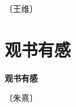 \documentclass[12pt,UTF-8,openany,fontset=none]{ctexbook}
\begin{document}
\begin{center}
    \vspace{10pt}
    
    \begin{large}
        
        〔王维〕
        
    \end{large}
    
    \vspace{8pt}
    
    \begin{huge}
        
        \phantom{。}

        \phantom{。}
        
        \phantom{。}

        \phantom{。}
        
    \end{huge}
    
\end{center}

\vspace{8pt}
\clearpage

\section{观书有感}



\begin{center}
    {\bfseries 观书有感}
\end{center}

\begin{center}
    \vspace{10pt}
    
    \begin{large}
        
        〔朱熹〕
        
    \end{large}
    
    \vspace{8pt}
    
    \begin{huge}
        
        \phantom{。}~~

        \phantom{。}
        
        \phantom{...} \!\! {}

        \phantom{。}
        
    \end{huge}
    
\end{center}
\end{document}
